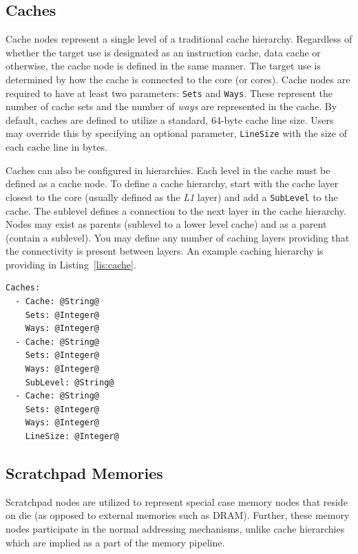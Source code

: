 \documentclass{article}
\begin{document}
\clearpage
\subsection{Caches}
\label{sec:CacheNodes}

Cache nodes represent a single level of a traditional cache hierarchy.  Regardless of whether the target use is 
designated as an instruction cache, data cache or otherwise, the cache node is defined in the same manner.  
The target use is determined by how the cache is connected to the core (or cores).  Cache nodes are required 
to have at least two parameters: \texttt{Sets} and \texttt{Ways}.  These represent the number of cache sets 
and the number of \textit{ways} are represented in the cache.  By default, caches are defined to utilize a 
standard, 64-byte cache line size.  Users may override this by specifying an optional parameter, \texttt{LineSize} 
with the size of each cache line in bytes.

Caches can also be configured in hierarchies.  Each level in the cache must be defined as a cache node.  To define 
a cache hierarchy, start with the cache layer closest to the core (usually defined as the \textit{L1} layer) and add a 
\texttt{SubLevel} to the cache.  The sublevel defines a connection to the next layer in the cache hierarchy.  Nodes 
may exist as parents (sublevel to a lower level cache) and as a parent (contain a sublevel).  You may define any 
number of caching layers providing that the connectivity is present between layers.  An example caching hierarchy 
is providing in Listing~\ref{lis:cache}.  

\vspace{0.125in}
\begin{lstlisting}[frame=single,style=base,caption={Cache Node Definition},captionpos=b,label={lis:cache}]
Caches:
  - Cache: @String@
    Sets: @Integer@
    Ways: @Integer@
  - Cache: @String@
    Sets: @Integer@
    Ways: @Integer@
    SubLevel: @String@
  - Cache: @String@
    Sets: @Integer@
    Ways: @Integer@
    LineSize: @Integer@
\end{lstlisting}

\clearpage
\subsection{Scratchpad Memories}
\label{sec:Spads}

Scratchpad nodes are utilized to represent special case memory nodes that reside 
on die (as opposed to external memories such as DRAM).  Further, these memory 
nodes participate in the normal addressing mechanisms, unlike cache hierarchies 
which are implied as a part of the memory pipeline.  
\end{document}
